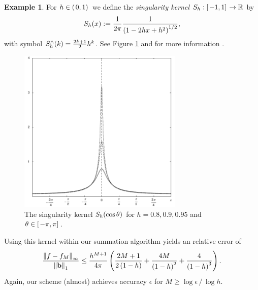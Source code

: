 \documentclass[11pt,a4paper,twoside,bibtotoc]{scrartcl}
\theoremstyle{plain}
\theoremstyle{definition}
\newtheorem{example}[theorem]{Example}
\theoremstyle{remark}
\numberwithin{equation}{section}
\numberwithin{table}{section}
\numberwithin{figure}{section}
\begin{document}
\begin{example}
  For $h \in \left(\left.0,1\right)\right.$ we define the \emph{singularity kernel}
  $S_{h}:\left[\left.-1,1\right]\right. \rightarrow \mathbb{R}$ by
  \[
    S_{h}{\hspace{-0.4ex}}\left(x\right) := \frac{1}{2\pi} \frac{1}{\left(1-2hx+h^2\right)^{1/2}},
  \]
  with symbol $S_{h}^{\wedge}{\hspace{-0.4ex}}\left(k\right) = \frac{2k+1}{2} h^k$.
  See Figure \ref{Basics:Figure:SingularityKernel} and for more information
  \cite[pp. 112]{frgesc}.
  \begin{figure}[tbp]
    \centering
    \includegraphics[width=0.7\textwidth]{images/singularity}
    \caption{The singularity kernel $S_{h}{\hspace{-0.4ex}}\left(\cos\theta\right)$ for $h =
    0.8,0.9,0.95$ and $\theta \in \left[\left.-\pi,\pi\right]\right.$.}
    \label{Basics:Figure:SingularityKernel}
  \end{figure}

  Using this kernel within our summation algorithm yields an relative error of
  \begin{equation}
    \label{error:singular}
    \frac{\left\|f - f_{M}\right\|_{\infty}}{\left\|\mathbf{b}\right\|_1} \le
    \frac{h^{M+1}}{4\pi} \left(\frac{2M+1}{2\left(1-h\right)}+
      \frac{4M}{\left(1-h\right)^2}+ \frac{4}{\left(1-h\right)^3}\right).
  \end{equation}
  Again, our scheme (almost) achieves accuracy $\epsilon$ for $M \ge
  \log\epsilon \, / \, \log h$.
\end{example}
\end{document}
